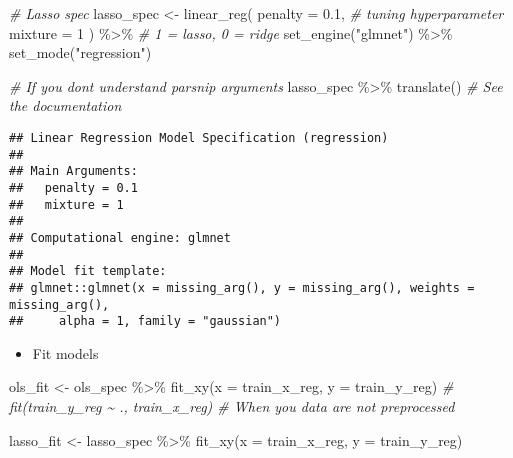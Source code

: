 \documentclass[
]{book}
\newenvironment{Shaded}{\begin{snugshade}}{\end{snugshade}}
\newcommand{\AttributeTok}[1]{\textcolor[rgb]{0.77,0.63,0.00}{#1}}
\newcommand{\CommentTok}[1]{\textcolor[rgb]{0.56,0.35,0.01}{\textit{#1}}}
\newcommand{\DecValTok}[1]{\textcolor[rgb]{0.00,0.00,0.81}{#1}}
\newcommand{\FloatTok}[1]{\textcolor[rgb]{0.00,0.00,0.81}{#1}}
\newcommand{\FunctionTok}[1]{\textcolor[rgb]{0.00,0.00,0.00}{#1}}
\newcommand{\NormalTok}[1]{#1}
\newcommand{\OtherTok}[1]{\textcolor[rgb]{0.56,0.35,0.01}{#1}}
\newcommand{\SpecialCharTok}[1]{\textcolor[rgb]{0.00,0.00,0.00}{#1}}
\newcommand{\StringTok}[1]{\textcolor[rgb]{0.31,0.60,0.02}{#1}}
\providecommand{\tightlist}{%
  \setlength{\itemsep}{0pt}\setlength{\parskip}{0pt}}
\begin{document}
\begin{Shaded}
\begin{Highlighting}[]
\CommentTok{\# Lasso spec}
\NormalTok{lasso\_spec }\OtherTok{\textless{}{-}} \FunctionTok{linear\_reg}\NormalTok{(}
  \AttributeTok{penalty =} \FloatTok{0.1}\NormalTok{, }\CommentTok{\# tuning hyperparameter}
  \AttributeTok{mixture =} \DecValTok{1}
\NormalTok{) }\SpecialCharTok{\%\textgreater{}\%} \CommentTok{\# 1 = lasso, 0 = ridge}
  \FunctionTok{set\_engine}\NormalTok{(}\StringTok{"glmnet"}\NormalTok{) }\SpecialCharTok{\%\textgreater{}\%}
  \FunctionTok{set\_mode}\NormalTok{(}\StringTok{"regression"}\NormalTok{)}

\CommentTok{\# If you don\textquotesingle{}t understand parsnip arguments}
\NormalTok{lasso\_spec }\SpecialCharTok{\%\textgreater{}\%} \FunctionTok{translate}\NormalTok{() }\CommentTok{\# See the documentation}
\end{Highlighting}
\end{Shaded}

\begin{verbatim}
## Linear Regression Model Specification (regression)
## 
## Main Arguments:
##   penalty = 0.1
##   mixture = 1
## 
## Computational engine: glmnet 
## 
## Model fit template:
## glmnet::glmnet(x = missing_arg(), y = missing_arg(), weights = missing_arg(), 
##     alpha = 1, family = "gaussian")
\end{verbatim}

\begin{itemize}
\tightlist
\item
  Fit models
\end{itemize}

\begin{Shaded}
\begin{Highlighting}[]
\NormalTok{ols\_fit }\OtherTok{\textless{}{-}}\NormalTok{ ols\_spec }\SpecialCharTok{\%\textgreater{}\%}
  \FunctionTok{fit\_xy}\NormalTok{(}\AttributeTok{x =}\NormalTok{ train\_x\_reg, }\AttributeTok{y =}\NormalTok{ train\_y\_reg)}
\CommentTok{\# fit(train\_y\_reg \textasciitilde{} ., train\_x\_reg) \# When you data are not preprocessed}

\NormalTok{lasso\_fit }\OtherTok{\textless{}{-}}\NormalTok{ lasso\_spec }\SpecialCharTok{\%\textgreater{}\%}
  \FunctionTok{fit\_xy}\NormalTok{(}\AttributeTok{x =}\NormalTok{ train\_x\_reg, }\AttributeTok{y =}\NormalTok{ train\_y\_reg)}
\end{Highlighting}
\end{Shaded}
\end{document}
